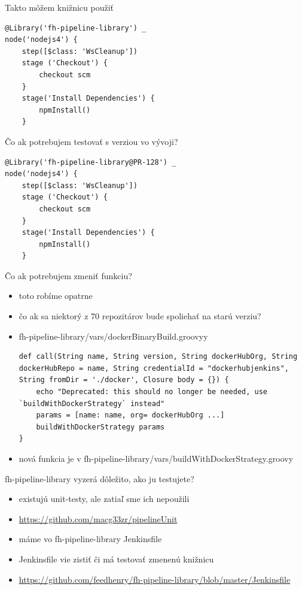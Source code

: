 \documentclass[bigger]{beamer}
\begin{document}
\begin{frame}[fragile,label={sec:orgcd35de8}]{Takto môžem knižnicu použiť}
 \begin{verbatim}
@Library('fh-pipeline-library') _
node('nodejs4') {
    step([$class: 'WsCleanup'])
    stage ('Checkout') {
        checkout scm
    }
    stage('Install Dependencies') {
        npmInstall()
    }

\end{verbatim}
\end{frame}

\begin{frame}[fragile,label={sec:org4f09fa6}]{Čo ak potrebujem testovať s verziou vo vývoji?}
 \begin{verbatim}
@Library('fh-pipeline-library@PR-128') _
node('nodejs4') {
    step([$class: 'WsCleanup'])
    stage ('Checkout') {
        checkout scm
    }
    stage('Install Dependencies') {
        npmInstall()
    }

\end{verbatim}
\end{frame}

\begin{frame}[fragile,label={sec:org40517a0}]{Čo ak potrebujem zmeniť funkciu?}
 \begin{itemize}
\item toto robíme opatrne
\item čo ak sa niektorý z 70 repozitárov bude spoliehať na starú verziu?
\item fh-pipeline-library/vars/dockerBinaryBuild.groovyy
\begin{verbatim}
def call(String name, String version, String dockerHubOrg, String dockerHubRepo = name, String credentialId = "dockerhubjenkins", String fromDir = './docker', Closure body = {}) {
    echo "Deprecated: this should no longer be needed, use `buildWithDockerStrategy` instead"
    params = [name: name, org= dockerHubOrg ...]
    buildWithDockerStrategy params
}
\end{verbatim}
\item nová funkcia je v fh-pipeline-library/vars/buildWithDockerStrategy.groovy
\end{itemize}
\end{frame}

\begin{frame}[label={sec:orgb7c0cba}]{fh-pipeline-library vyzerá dôležito, ako ju testujete?}
\begin{itemize}
\item existujú unit-testy, ale zatiaľ sme ich nepoužili
\item \url{https://github.com/macg33zr/pipelineUnit}
\item máme vo fh-pipeline-library Jenkinsfile
\item Jenkinsfile vie zistiť či má testovať zmenenú knižnicu
\item \url{https://github.com/feedhenry/fh-pipeline-library/blob/master/Jenkinsfile}
\end{itemize}
\end{frame}
\end{document}
